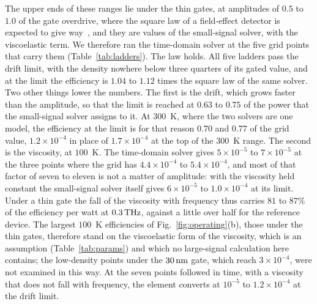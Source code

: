 The upper ends of these ranges lie under the thin gates, at amplitudes
of $0.5$ to $1.0$ of the gate overdrive, where the square law of a
field-effect detector is expected to give
way~\cite{gutin2012plasmonic,rudin2014theory,but2014nonlinear}, and they
are values of the small-signal solver, with the viscoelastic term. We
therefore ran the time-domain solver at the five grid points that carry
them (Table~\ref{tab:ladders}). The law holds. All five ladders pass the
drift limit, with the density nowhere below three quarters of its gated
value, and at the limit the efficiency is $1.04$ to $1.12$ times the
square law of the same solver. Two other things lower the numbers. The
first is the drift, which grows faster than the amplitude, so that the
limit is reached at $0.63$ to $0.75$ of the power that the small-signal
solver assigns to it. At $300$~K, where the two solvers are one model,
the efficiency at the limit is for that reason $0.70$ and $0.77$ of the
grid value, $1.2\times10^{-4}$ in place of $1.7\times10^{-4}$ at the top
of the $300$~K range. The second is the viscosity, at $100$~K. The
time-domain solver gives $5\times10^{-5}$ to $7\times10^{-5}$ at the
three points where the grid has $4.4\times10^{-4}$ to
$5.4\times10^{-4}$, and most of that factor of seven to eleven is not a
matter of amplitude: with the viscosity held constant the small-signal
solver itself gives $6\times10^{-5}$ to $1.0\times10^{-4}$ at its limit.
Under a thin gate the fall of the viscosity with frequency thus carries
$81$ to $87\%$ of the efficiency per watt at $0.3\,\mathrm{THz}$, against a little
over half for the reference device. The largest $100$~K efficiencies of
Fig.~\ref{fig:operating}(b), those under the thin gates, therefore stand
on the viscoelastic form of the viscosity, which is an assumption
(Table~\ref{tab:params}) and which no large-signal calculation here
contains; the low-density points under the $30\,\mathrm{nm}$ gate, which reach
$3\times10^{-4}$, were not examined in this way. At the seven points
followed in time, with a viscosity that does not fall with frequency,
the element converts at $10^{-5}$ to $1.2\times10^{-4}$ at the drift
limit.

